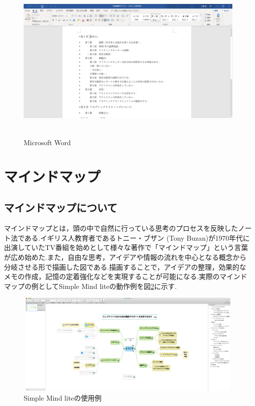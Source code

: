 \documentclass[a4j,12pt]{jarticle}
\begin{document}
\begin{figure}[H]
\begin{center}
 \includegraphics[clip,width=120mm,height=80mm]{figure/word.png}
 \end{center}
 \caption{Microsoft Word}
 \label{fig:d}
\end{figure}

\newpage
\section{マインドマップ}
\subsection{マインドマップについて}
マインドマップとは，頭の中で自然に行っている思考のプロセスを反映したノート法である.イギリス人教育者であるトニー・ブザン (Tony Buzan)が1970年代に出演していたTV番組を始めとして様々な著作で「マインドマップ」という言葉が広め始めた\cite{ren4}.また，自由な思考，アイデアや情報の流れを中心となる概念から分岐させる形で描画した図である.描画することで，アイデアの整理，効果的なメモの作成，記憶の定着強化などを実現することが可能になる.実際のマインドマップの例としてSimple Mind liteの動作例を図\ref{fig:e}に示す.
\begin{figure}[h]
\begin{center}
 \includegraphics[clip,width=130mm,height=50mm]{figure/maindmap.png}
\end{center}
 \caption{Simple Mind liteの使用例}
 \label{fig:e}
\end{figure}
\newpage
\end{document}
